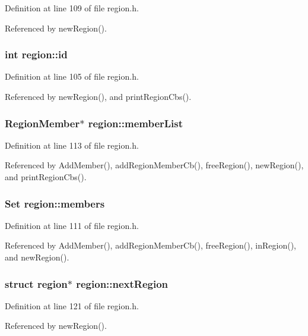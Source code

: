 Definition at line 109 of file region.h.

Referenced by new\-Region().
\subsubsection{\setlength{\rightskip}{0pt plus 5cm}int \bf{region::id}}\label{structregion_8de131515252136e074c8b4402eda2ce}




Definition at line 105 of file region.h.

Referenced by new\-Region(), and print\-Region\-Cbs().
\subsubsection{\setlength{\rightskip}{0pt plus 5cm}\bf{Region\-Member}$\ast$ \bf{region::member\-List}}\label{structregion_c77a736e2a8c54a9319bc3e4301fadb1}




Definition at line 113 of file region.h.

Referenced by Add\-Member(), add\-Region\-Member\-Cb(), free\-Region(), new\-Region(), and print\-Region\-Cbs().
\subsubsection{\setlength{\rightskip}{0pt plus 5cm}\bf{Set} \bf{region::members}}\label{structregion_e1a621437118fc1efeaf470e8402e990}




Definition at line 111 of file region.h.

Referenced by Add\-Member(), add\-Region\-Member\-Cb(), free\-Region(), in\-Region(), and new\-Region().
\subsubsection{\setlength{\rightskip}{0pt plus 5cm}struct \bf{region}$\ast$ \bf{region::next\-Region}}\label{structregion_7a9008f9c41a1239593a19bdf024db05}




Definition at line 121 of file region.h.

Referenced by new\-Region().
